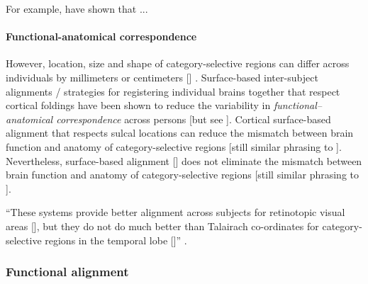 For example,  \citep{frost2012measuring, weiner2018defining,
zhen2017quantifying, zhen2015quantifying, rosenke2021probabilistic,
wang2015probabilistic} have shown that ...


\paragraph{Functional-anatomical correspondence}


However, location, size and shape of category-selective regions can differ
across individuals by millimeters or centimeters [\citep{zhen2017quantifying,
zhen2015quantifying}] \citep{feilong2018reliable}.
%
Surface-based inter-subject alignments / strategies for registering individual
brains together that respect cortical foldings \citep{fischl1999cortical,
yeo2009spherical} have been shown to reduce the variability in
\textit{functional--anatomical correspondence} \citep{feilong2018reliable,
kumar2020brainiak} across persons \citep{klein2010evaluation,
frost2012measuring} [but see \citep{langers2014assessment}].
%
Cortical surface-based alignment \citep{fischl2012freesurfer} that respects
sulcal locations can reduce the mismatch between brain function and anatomy of
category-selective regions \citep{duncan2009consistency, frost2012measuring,
weiner2018defining, weiner2014mid} [still similar phrasing to
\citep{feilong2018reliable}].
%
Nevertheless, surface-based alignment [\citep{fischl2012freesurfer}] does not
eliminate the mismatch between brain function and anatomy of category-selective
regions \citep{duncan2009consistency, frost2012measuring, weiner2018defining,
weiner2014mid}[still similar phrasing to \citep{feilong2018reliable}].

%
``These systems provide better alignment across subjects for retinotopic visual
areas [\citep{fischl1999high}], but they do not do much better than Talairach
co-ordinates for category-selective regions in the temporal lobe
[\citep{spiridon2006location}]'' \citep{saxe2006divide}.


\subsubsection{Functional alignment}


